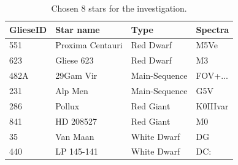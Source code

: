 \documentclass{IEEEtran}
\begin{document}
  \begin{table}[h!]
    \begin{center}
      \caption{Chosen 8 stars for the investigation.}
      \begin{tabular}{l | l | l | l}
        \textbf{GlieseID} & \textbf{Star name} & \textbf{Type} & \textbf{Spectra}\\
        \hline
        551 & Proxima Centauri & Red Dwarf & M5Ve\\
        623 & Gliese 623 & Red Dwarf & M3\\
        482A & 29Gam Vir & Main-Sequence & FOV+...\\
        231 & Alp Men & Main-Sequence & G5V\\
        286 & Pollux & Red Giant & K0IIIvar\\
        841 & HD 208527 & Red Giant & M0\\
        35 & Van Maan & White Dwarf & DG\\
        440 & LP 145-141 & White Dwarf & DC:\\
      \end{tabular}
      \label{stars}
    \end{center}
  \end{table}
  
\end{document}
